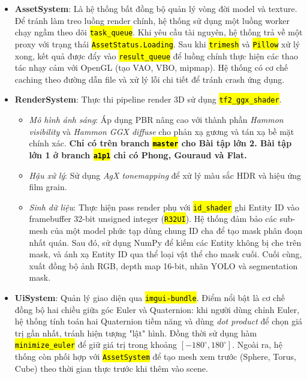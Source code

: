 \documentclass[a4paper]{article}
\newcommand{\code}[1]{\hl{\texttt{#1}}}
\begin{document}
\begin{itemize}
    \item \textbf{AssetSystem}: Là hệ thống bất đồng bộ quản lý vòng đời model và texture. Để tránh làm treo luồng render chính, hệ thống sử dụng một luồng worker chạy ngầm theo dõi \code{task\_queue}. Khi yêu cầu tài nguyên, hệ thống trả về một proxy với trạng thái \code{AssetStatus.Loading}. Sau khi \code{trimesh} và \code{Pillow} xử lý xong, kết quả được đẩy vào \code{result\_queue} để luồng chính thực hiện các thao tác nhạy cảm với OpenGL (tạo VAO, VBO, mipmap). Hệ thống có cơ chế caching theo đường dẫn file và xử lý lỗi chi tiết để tránh crash ứng dụng.

    \item \textbf{RenderSystem}: Thực thi pipeline render 3D sử dụng \code{tf2\_ggx\_shader}. 
    \begin{itemize}
        \item \textit{Mô hình ánh sáng}: Áp dụng PBR nâng cao với thành phần \textit{Hammon visibility} và \textit{Hammon GGX diffuse} cho phản xạ gương và tán xạ bề mặt chính xác. \textbf{Chỉ có trên branch \code{master} cho Bài tập lớn 2. Bài tập lớn 1 ở branch \code{a1p1} chỉ có Phong, Gouraud và Flat.}
        \item \textit{Hậu xử lý}: Sử dụng \textit{AgX tonemapping} để xử lý màu sắc HDR và hiệu ứng film grain.
        \item \textit{Sinh dữ liệu}: Thực hiện pass render phụ với \code{id\_shader} ghi Entity ID vào framebuffer 32-bit unsigned integer (\code{R32UI}). Hệ thống đảm bảo các sub-mesh của một model phức tạp dùng chung ID cha để tạo mask phân đoạn nhất quán. Sau đó, sử dụng NumPy để kiếm các Entity không bị che trên mask, và ánh xạ Entity ID qua thể loại vật thể cho mask cuối. Cuối cùng, xuất đồng bộ ảnh RGB, depth map 16-bit, nhãn YOLO và segmentation mask.
    \end{itemize}

    \item \textbf{UiSystem}: Quản lý giao diện qua \code{imgui-bundle}. Điểm nổi bật là cơ chế đồng bộ hai chiều giữa góc Euler và Quaternion: khi người dùng chỉnh Euler, hệ thống tính toán hai Quaternion tiềm năng và dùng \textit{dot product} để chọn giá trị gần nhất, tránh hiện tượng "lật" hình. Đồng thời sử dụng hàm \code{minimize\_euler} để giữ giá trị trong khoảng $[-180^\circ, 180^\circ]$. Ngoài ra, hệ thống còn phối hợp với \code{AssetSystem} để tạo mesh xem trước (Sphere, Torus, Cube) theo thời gian thực trước khi thêm vào scene.


\end{itemize}
\end{document}
